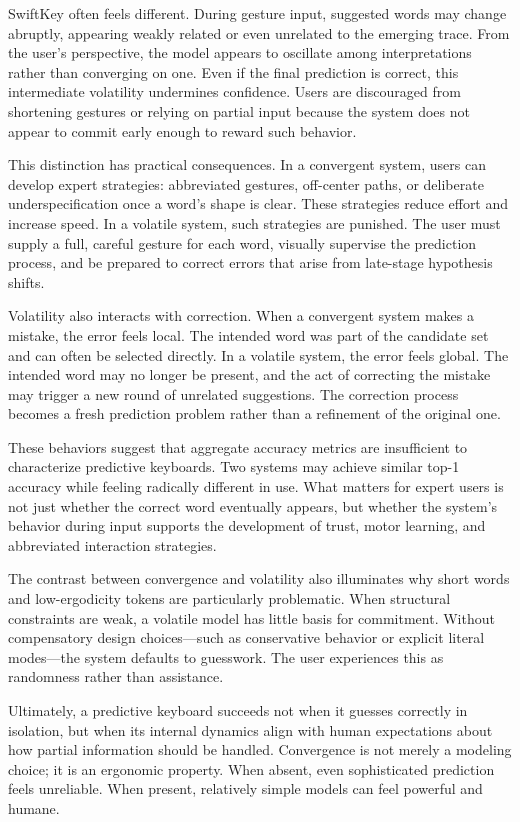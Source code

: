 \documentclass[11pt]{article}
\begin{document}
SwiftKey often feels different. During gesture input, suggested words may change abruptly, appearing weakly related or even unrelated to the emerging trace. From the user’s perspective, the model appears to oscillate among interpretations rather than converging on one. Even if the final prediction is correct, this intermediate volatility undermines confidence. Users are discouraged from shortening gestures or relying on partial input because the system does not appear to commit early enough to reward such behavior.

This distinction has practical consequences. In a convergent system, users can develop expert strategies: abbreviated gestures, off-center paths, or deliberate underspecification once a word’s shape is clear. These strategies reduce effort and increase speed. In a volatile system, such strategies are punished. The user must supply a full, careful gesture for each word, visually supervise the prediction process, and be prepared to correct errors that arise from late-stage hypothesis shifts.

Volatility also interacts with correction. When a convergent system makes a mistake, the error feels local. The intended word was part of the candidate set and can often be selected directly. In a volatile system, the error feels global. The intended word may no longer be present, and the act of correcting the mistake may trigger a new round of unrelated suggestions. The correction process becomes a fresh prediction problem rather than a refinement of the original one.

These behaviors suggest that aggregate accuracy metrics are insufficient to characterize predictive keyboards. Two systems may achieve similar top-1 accuracy while feeling radically different in use. What matters for expert users is not just whether the correct word eventually appears, but whether the system’s behavior during input supports the development of trust, motor learning, and abbreviated interaction strategies.

The contrast between convergence and volatility also illuminates why short words and low-ergodicity tokens are particularly problematic. When structural constraints are weak, a volatile model has little basis for commitment. Without compensatory design choices—such as conservative behavior or explicit literal modes—the system defaults to guesswork. The user experiences this as randomness rather than assistance.

Ultimately, a predictive keyboard succeeds not when it guesses correctly in isolation, but when its internal dynamics align with human expectations about how partial information should be handled. Convergence is not merely a modeling choice; it is an ergonomic property. When absent, even sophisticated prediction feels unreliable. When present, relatively simple models can feel powerful and humane.
\end{document}
